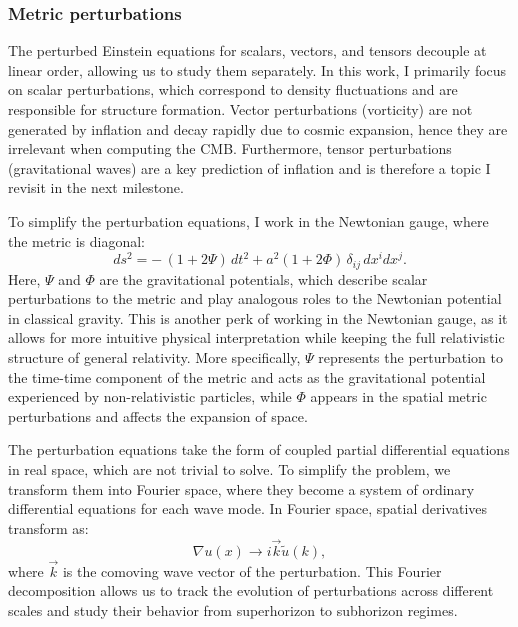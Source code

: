 \documentclass{aa}
\numberwithin{equation}{section}
\numberwithin{table}{section}
\numberwithin{figure}{section}
\begin{document}


\subsubsection{Metric perturbations}

The perturbed Einstein equations for scalars, vectors, and tensors decouple at linear order, allowing us to study them separately. In this work, I primarily focus on scalar perturbations, which correspond to density fluctuations and are responsible for structure formation. Vector perturbations (vorticity) are not generated by inflation and decay rapidly due to cosmic expansion, hence they are irrelevant when computing the CMB. Furthermore, tensor perturbations (gravitational waves) are a key prediction of inflation and is therefore a topic I revisit in the next milestone. 

To simplify the perturbation equations, I work in the Newtonian gauge, where the metric is diagonal:
\begin{equation}
ds^2 = - \,(1 + 2\Psi)\,dt^2 + a^2 (1 + 2\Phi)\, \delta_{ij}\, dx^i dx^j.
\end{equation}
Here, $\Psi$ and $\Phi$ are the gravitational potentials, which describe scalar perturbations to the metric and play analogous roles to the Newtonian potential in classical gravity. This is another perk of working in the Newtonian gauge, as it allows for more intuitive physical interpretation while keeping the full relativistic structure of general relativity. More specifically, $\Psi$ represents the perturbation to the time-time component of the metric and acts as the gravitational potential experienced by non-relativistic particles, while $\Phi$ appears in the spatial metric perturbations and affects the expansion of space. 


The perturbation equations take the form of coupled partial differential equations in real space, which are not trivial to solve. To simplify the problem, we transform them into Fourier space, where they become a system of ordinary differential equations for each wave mode. 
In Fourier space, spatial derivatives transform as:  
\begin{equation}
\nabla u(x) \rightarrow i \vec{k} \tilde{u}(k),
\end{equation}
where $\vec{k}$ is the comoving wave vector of the perturbation. This Fourier decomposition allows us to track the evolution of perturbations across different scales and study their behavior from superhorizon to subhorizon regimes. 
\end{document}
